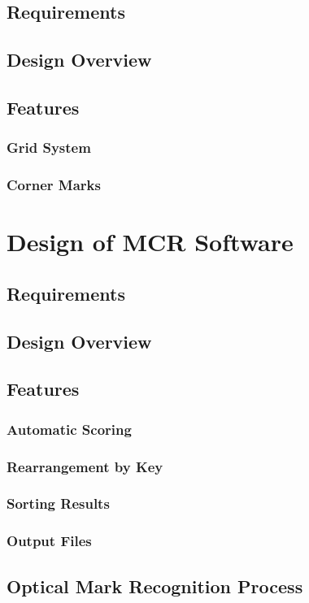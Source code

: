 \documentclass[12pt, letterpaper]{report}
\begin{document}
\section{Requirements}
\section{Design Overview}
\section{Features}
\subsection{Grid System}
\subsection{Corner Marks}

\chapter{Design of MCR Software}
\section{Requirements}
\section{Design Overview}
\section{Features}
\subsection{Automatic Scoring}
\subsection{Rearrangement by Key}
\subsection{Sorting Results}
\subsection{Output Files}
\section{Optical Mark Recognition Process}
\end{document}
